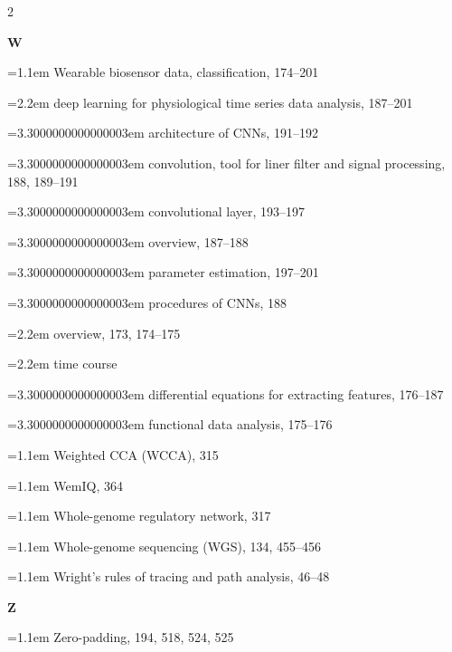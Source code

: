 \begin{multicols}{2}
\par{}\medskip\noindent\textbf{W}\par\nobreak\smallskip\nobreak
\noindent\hangindent=1.1em Wearable biosensor data, classification, 174--201\par
\noindent\hangindent=2.2em \hspace*{1.1em}deep learning for physiological time series data analysis, 187--201\par
\noindent\hangindent=3.3000000000000003em \hspace*{2.2em}architecture of CNNs, 191--192\par
\noindent\hangindent=3.3000000000000003em \hspace*{2.2em}convolution, tool for liner filter and signal processing, 188, 189--191\par
\noindent\hangindent=3.3000000000000003em \hspace*{2.2em}convolutional layer, 193--197\par
\noindent\hangindent=3.3000000000000003em \hspace*{2.2em}overview, 187--188\par
\noindent\hangindent=3.3000000000000003em \hspace*{2.2em}parameter estimation, 197--201\par
\noindent\hangindent=3.3000000000000003em \hspace*{2.2em}procedures of CNNs, 188\par
\noindent\hangindent=2.2em \hspace*{1.1em}overview, 173, 174--175\par
\noindent\hangindent=2.2em \hspace*{1.1em}time course\par
\noindent\hangindent=3.3000000000000003em \hspace*{2.2em}differential equations for extracting features, 176--187\par
\noindent\hangindent=3.3000000000000003em \hspace*{2.2em}functional data analysis, 175--176\par
\noindent\hangindent=1.1em Weighted CCA (WCCA), 315\par
\noindent\hangindent=1.1em WemIQ, 364\par
\noindent\hangindent=1.1em Whole-genome regulatory network, 317\par
\noindent\hangindent=1.1em Whole-genome sequencing (WGS), 134, 455--456\par
\noindent\hangindent=1.1em Wright's rules of tracing and path analysis, 46--48\par

\par{}\medskip\noindent\textbf{Z}\par\nobreak\smallskip\nobreak
\noindent\hangindent=1.1em Zero-padding, 194, 518, 524, 525\par

\end{multicols}
\endgroup
{}
